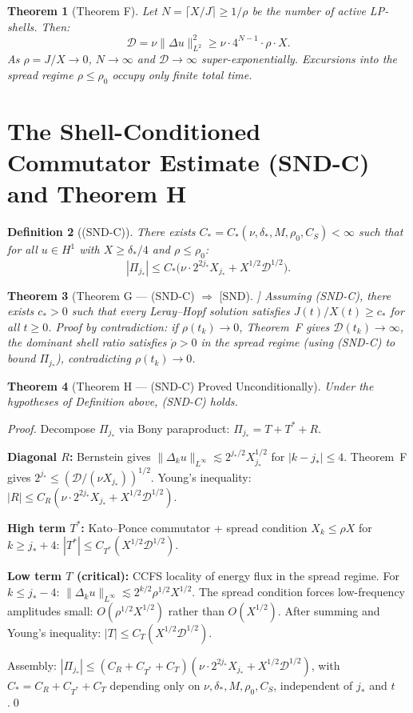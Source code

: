 \documentclass[11pt]{article}
\newtheorem{theorem}{Theorem}[section]
\newtheorem{definition}[theorem]{Definition}
\begin{document}
\begin{theorem}[Theorem F]
Let $N=\lceil X/J\rceil\geq 1/\rho$ be the number of active LP-shells. Then:
\[\mathcal{D}=\nu\|\Delta u\|_{L^2}^2\geq\nu\cdot 4^{N-1}\cdot\rho\cdot X.\]
As $\rho=J/X\to 0$, $N\to\infty$ and $\mathcal{D}\to\infty$ \emph{super-exponentially}.
Excursions into the spread regime $\rho\leq\rho_0$ occupy only finite total time.
\end{theorem}

\section{The Shell-Conditioned Commutator Estimate (SND-C) and Theorem H}

\begin{definition}[(SND-C)]
There exists $C_*=C_*(\nu,\delta_*,M,\rho_0,C_S)<\infty$ such that for all $u\in H^1$ with $X\geq\delta_*/4$ and $\rho\leq\rho_0$:
\[|\Pi_{j_*}|\leq C_*\bigl(\nu\cdot 2^{2j_*}X_{j_*}+X^{1/2}\mathcal{D}^{1/2}\bigr).\]
\end{definition}

\begin{theorem}[Theorem G --- (SND-C) $\Longrightarrow$ [SND]]
Assuming (SND-C), there exists $c_*>0$ such that every Leray--Hopf solution satisfies $J(t)/X(t)\geq c_*$ for all $t\geq 0$.
Proof by contradiction: if $\rho(t_k)\to 0$, Theorem~F gives $\mathcal{D}(t_k)\to\infty$, the dominant shell ratio satisfies $\dot\rho>0$ in the spread regime (using (SND-C) to bound $\Pi_{j_*}$), contradicting $\rho(t_k)\to 0$.
\end{theorem}

\begin{theorem}[Theorem H --- (SND-C) Proved Unconditionally]
Under the hypotheses of Definition above, (SND-C) holds.
\end{theorem}

\begin{proof}
Decompose $\Pi_{j_*}$ via Bony paraproduct: $\Pi_{j_*}=T+T^*+R$.

\textbf{Diagonal $R$:} Bernstein gives $\|\Delta_k u\|_{L^\infty}\lesssim 2^{j_*/2}X_{j_*}^{1/2}$ for $|k-j_*|\leq 4$.
Theorem~F gives $2^{j_*}\leq(\mathcal{D}/(\nu X_{j_*}))^{1/2}$.
Young's inequality: $|R|\leq C_R(\nu\cdot 2^{2j_*}X_{j_*}+X^{1/2}\mathcal{D}^{1/2})$.

\textbf{High term $T^*$:} Kato--Ponce commutator + spread condition $X_k\leq\rho X$ for $k\geq j_*+4$:
$|T^*|\leq C_{T^*}(X^{1/2}\mathcal{D}^{1/2})$.

\textbf{Low term $T$ (critical):} CCFS locality of energy flux in the spread regime.
For $k\leq j_*-4$: $\|\Delta_k u\|_{L^\infty}\lesssim 2^{k/2}\rho^{1/2}X^{1/2}$.
The spread condition forces low-frequency amplitudes small: $O(\rho^{1/2}X^{1/2})$ rather than $O(X^{1/2})$.
After summing and Young's inequality: $|T|\leq C_T(X^{1/2}\mathcal{D}^{1/2})$.

Assembly: $|\Pi_{j_*}|\leq(C_R+C_{T^*}+C_T)(\nu\cdot 2^{2j_*}X_{j_*}+X^{1/2}\mathcal{D}^{1/2})$,
with $C_*=C_R+C_{T^*}+C_T$ depending only on $\nu,\delta_*,M,\rho_0,C_S$, independent of $j_*$ and $t$.\qed
\end{proof}
\end{document}
